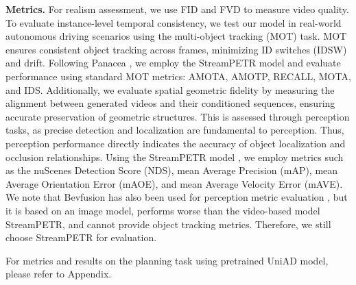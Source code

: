 \noindent \textbf{Metrics.}
For realism assessment, we use FID \cite{FID} and FVD \cite{Thomas2018fvd} to measure video quality. To evaluate instance-level temporal consistency, we test our model in real-world autonomous driving scenarios using the multi-object tracking (MOT) task. MOT ensures consistent object tracking across frames, minimizing ID switches (IDSW) and drift. Following Panacea \cite{wen2024panacea}, we employ the StreamPETR model \cite{streampetr} and evaluate performance using standard MOT metrics: AMOTA, AMOTP, RECALL, MOTA, and IDS. Additionally, we evaluate spatial geometric fidelity by measuring the alignment between generated videos and their conditioned sequences, ensuring accurate preservation of geometric structures. This is assessed through perception tasks, as precise detection and localization are fundamental to perception. Thus, perception performance directly indicates the accuracy of object localization and occlusion relationships. Using the StreamPETR model \cite{streampetr}, we employ metrics such as the nuScenes Detection Score (NDS), mean Average Precision (mAP), mean Average Orientation Error (mAOE), and mean Average Velocity Error (mAVE). We note that Bevfusion \cite{liu2023bevfusion} has also been used for perception metric evaluation \cite{gao2023magicdrive}, but it is based on an image model, performs worse than the video-based model StreamPETR, and cannot provide object tracking metrics. Therefore, we still choose StreamPETR for evaluation.

\noindent For metrics and results on the planning task using pretrained UniAD \cite{shi2016uniad} model, please refer to Appendix.



